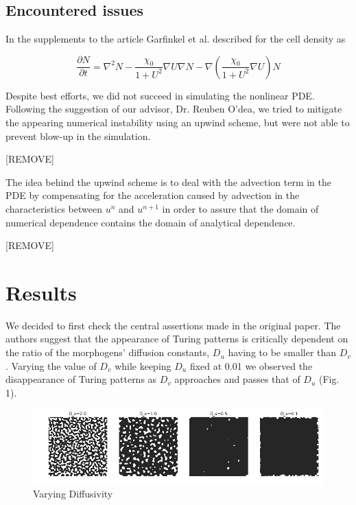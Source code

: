 \documentclass{article}
\begin{document}
\subsection{Encountered issues}

In the supplements to the article Garfinkel et al. described for the cell density as

$$\frac{\partial N}{\partial t}=\nabla^2N-\frac{\chi_0}{1+U^2}\nabla U \nabla N- \nabla(\frac{\chi_0}{1+U^2}\nabla U)N$$

Despite best efforts, we did not succeed in simulating the nonlinear PDE. Following the suggestion of our advisor, Dr. Reuben O'dea, we tried to mitigate the appearing numerical instability using an upwind scheme, but were not able to prevent blow-up in the simulation.

[REMOVE]

The idea behind the upwind scheme is to deal with the advection term in the PDE by compensating for the acceleration caused by advection in the characteristics between $u^n$ and $u^{n+1}$ in order to assure that the domain of numerical dependence contains the domain of analytical dependence.

[REMOVE]

\pagebreak

\section{Results}

We decided to first check the central assertions made in the original paper. The authors suggest that the appearance of Turing patterns is critically dependent on the ratio of the morphogens' diffusion constants, $D_u$ having to be smaller than $D_v$. Varying the value of $D_v$ while keeping $D_u$ fixed at 0.01 we observed the disappearance of Turing patterns as $D_v$ approaches and passes that of $D_u$ (Fig. 1).

\begin{figure}[H]
  \includegraphics[width=\linewidth]{diffusivity.png}
  \caption{Varying Diffusivity}
  \label{fig:dv}
\end{figure}
\end{document}
